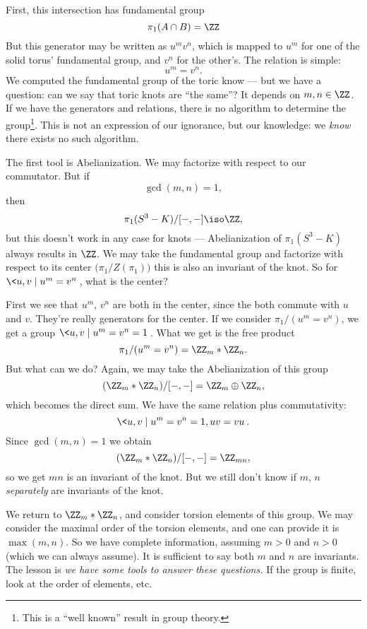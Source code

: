 First, this intersection has fundamental group
\begin{equation}
\pi_{1}(A\cap B)=\ZZ
\end{equation}
But this generator may be written as $u^mv^n$, which is mapped to
$u^m$ for one of the solid torus' fundamental group, and $v^n$
for the other's. The relation is simple:
\begin{equation}
u^m=v^n.
\end{equation}
We computed the fundamental group of the toric know --- but we
have a question: can we say that toric knots are ``the same''? It
depends on $m,n\in\ZZ$. If we have the generators and relations,
there is no algorithm to determine the group\footnote{This is a
  ``well known'' result in group theory.}. This is not an
expression of our ignorance, but our knowledge: we \emph{know}
there exists no such algorithm.

The first tool is Abelianization. We may
factorize with respect to our commutator. But if
\begin{equation}
\gcd(m,n)=1,
\end{equation}
then
\begin{equation}
\pi_{1}(S^{3}-K)/[-,-]\iso\ZZ,
\end{equation}
but this doesn't work in any case for knots --- Abelianization of
$\pi_{1}(S^{3}-K)$ always results in $\ZZ$. We may take the
fundamental group and factorize with respect to its center
$\bigl(\pi_1/Z(\pi_1)\bigr)$ this is also an invariant of the knot.
So for $\<u,v\mid u^m=v^n\>$, what is the center?

First we see that $u^m$, $v^n$ are both in the center, since the
both commute with $u$ and $v$. They're really generators for the
center. If we consider $\pi_1/(u^m=v^n)$, we get a group
$\<u,v\mid u^m=v^n=1\>$. What we get is the free product
\begin{equation}
\pi_1/(u^m=v^n) = \ZZ_m*\ZZ_n.
\end{equation}
But what can we do? Again, we may take the Abelianization of this
group
\begin{equation}
(\ZZ_m*\ZZ_n)/[-,-]=\ZZ_m\oplus\ZZ_n,
\end{equation}
which becomes the direct sum. We have the same relation plus
commutativity:
\begin{equation*}
\<u,v\mid u^m=v^n=1,uv=vu\>.
\end{equation*}
Since $\gcd(m,n)=1$ we obtain
\begin{equation}
(\ZZ_m*\ZZ_n)/[-,-]=\ZZ_{mn},
\end{equation}
so we get $mn$ is an invariant of the knot. But we still don't
know if $m$, $n$ \emph{separately} are invariants of the knot.

We return to $\ZZ_m*\ZZ_n$, and consider torsion elements of this
group. We may consider the maximal order of the torsion elements,
and one can provide it is $\max(m,n)$. So we have complete
information, assuming $m>0$ and $n>0$ (which we can always
assume). It is sufficient to say both $m$ and $n$ are
invariants. The lesson is \emph{we have some tools to answer
these questions.} If the group is finite, look at the order of
elements, etc.
